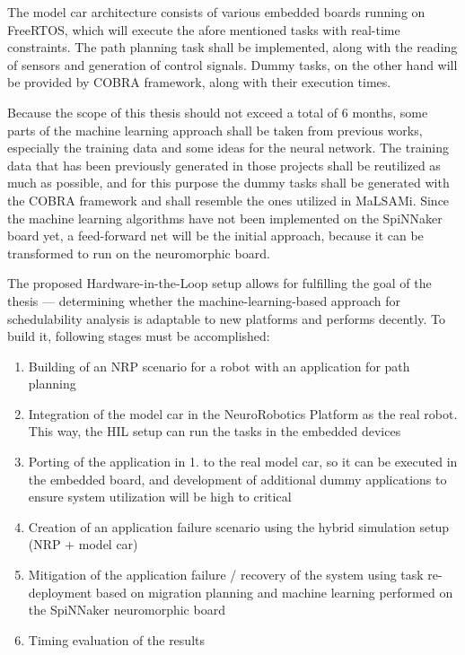 The model car architecture consists of various embedded boards running on FreeRTOS, which will execute the afore mentioned tasks with real-time constraints. The path planning task shall be implemented, along with the reading of sensors and generation of control signals. Dummy tasks, on the other hand will be provided by COBRA framework, along with their execution times. 

Because the scope of this thesis should not exceed a total of 6 months, some parts of the machine learning approach shall be taken from previous works, especially the training data and some ideas for the neural network. The training data that has been previously generated in those projects shall be reutilized as much as possible, and for this purpose the dummy tasks shall be generated with the COBRA framework and shall resemble the ones utilized in MaLSAMi. Since the machine learning algorithms have not been implemented on the SpiNNaker board yet, a feed-forward net will be the initial approach, because it can be transformed to run on the neuromorphic board.

The proposed Hardware-in-the-Loop setup allows for fulfilling the goal of the thesis --- determining whether the machine-learning-based approach for schedulability analysis is adaptable to new platforms and performs decently. To build it, following stages must be accomplished:
\begin{enumerate}
\item	Building of an NRP scenario for a robot with an application for path planning
\item	Integration of the model car in the NeuroRobotics Platform as the real robot. This way, the HIL setup can run the tasks in the embedded devices
\item	Porting of the application in 1. to the real model car, so it can be executed in the embedded board, and development of additional dummy applications to ensure system utilization will be high to critical
\item	Creation of an application failure scenario using the hybrid simulation setup (NRP + model car)
\item	Mitigation of the application failure / recovery of the system using task re-deployment based on migration planning and machine learning performed on the SpiNNaker neuromorphic board
\item	Timing evaluation of the results
\end{enumerate}

